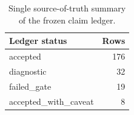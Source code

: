 \begin{table}[t]
\centering
\begin{tabular}{@{}lr@{}}
\toprule
Ledger status & Rows \\
\midrule
accepted & 176 \\
diagnostic & 32 \\
failed\_gate & 19 \\
accepted\_with\_caveat & 8 \\
\bottomrule
\end{tabular}
\caption{Single source-of-truth summary of the frozen claim ledger.}
\label{tab:provenance-summary}
\end{table}
